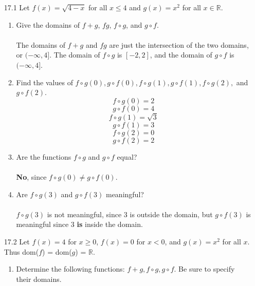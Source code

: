 
\usepackage{amsmath, dsfont}

\oddsidemargin 0in
\evensidemargin 0in
\textwidth 6.5in
\topmargin -0.5in
\textheight 9.0in
\newcommand{\norm}[1]{\left\lVert #1 \right\rVert}
\newcommand{\abs}[1]{\left\vert #1 \right\vert}
\newcommand{\?}{\stackrel{?}{=}}



\pagestyle{myheadings}

\begin{enumerate}
  \item [17.1]
    Let $f(x) = \sqrt{4 - x}$ for all $x \leq 4$ and $g(x) = x^2$ for all $x \in \mathds{R}$.
    \begin{enumerate}
      \item Give the domains of $f+g$, $fg$, $f \circ g$, and $g \circ f$.\\\\

        The domains of $f+g$ and $fg$ are just the intersection of the two domains, or $(- \infty, 4]$. The domain of $f \circ g$ is $[-2,2]$, and the domain of $g \circ f$ is $(- \infty, 4]$.
      \item Find the values of $f \circ g(0), g \circ f(0), f \circ g(1), g \circ f(1), f \circ g(2),$ and $g \circ f(2)$.
        $$f \circ g(0) = 2$$
        $$g \circ f(0) = 4$$
        $$f \circ g(1) = \sqrt{3}$$
        $$g \circ f(1) = 3$$
        $$f \circ g(2) = 0$$
        $$g \circ f(2) = 2$$
        
      \item Are the functions $f \circ g$ and $g \circ f$ equal?\\\\

        \textbf{No}, since $f \circ g(0) \neq g \circ f(0)$.
      \item Are $f \circ g(3)$ and $g \circ f(3)$ meaningful?\\\\

        $f \circ g(3)$ is not meaningful, since $3$ is outside the domain, but $g \circ f(3)$ is meaningful since $3$ \textbf{is} inside the domain.
    \end{enumerate}
  \item [17.2]
    Let $f(x) = 4$ for $x \geq 0$, $f(x) = 0$ for $x < 0$, and $g(x) = x^2$ for all $x$. Thus dom($f$) = dom($g$) = $\mathds{R}$.
    \begin{enumerate}
      \item Determine the following functions: $f + g, f \circ g, g \circ f$. Be sure to specify their domains.


\end{enumerate}
\end{enumerate}
